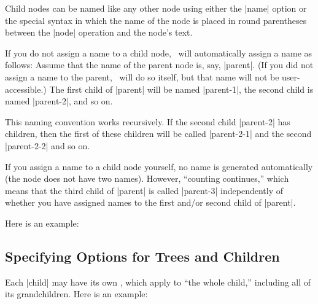 Child nodes can be named like any other node using either the |name|
option or the special syntax in which the name of the node is placed
in round parentheses between the |node| operation and the node's
text.

If you do not assign a name to a child node, \tikzname\ will
automatically assign a name as follows: Assume that the name of the
parent node is, say, |parent|. (If you did not assign a
name to the parent, \tikzname\ will do so itself, but that name will
not be user-accessible.) The first child
of |parent| will be named |parent-1|, the second child is named
|parent-2|, and so on.

This naming convention works recursively. If the second child
|parent-2| has children, then the first of these children will be
called |parent-2-1| and the second |parent-2-2| and so on.

If you assign a name to a child node yourself, no name is generated
automatically (the node does not have two names). However, ``counting
continues,'' which means that the third child of |parent| is called
|parent-3| independently of whether you have assigned names to the
first and/or second child of |parent|.

Here is an example:

\begin{codeexample}[]
\end{codeexample}

\subsection{Specifying Options for Trees and Children}

Each |child| may have its own , which apply to ``the
whole child,'' including all of its grandchildren. Here is an
example:

\begin{codeexample}[]
\end{codeexample}

